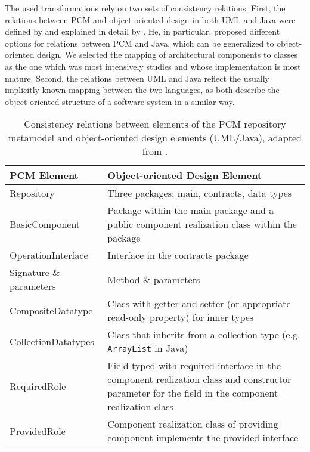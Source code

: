 The used transformations rely on two sets of consistency relations.
First, the relations between \gls{PCM} and object-oriented design in both \gls{UML} and Java were defined by and explained in detail by \textcite{langhammer2015a, langhammer2017a}.
He, in particular, proposed different options for relations between \gls{PCM} and Java, which can be generalized to object-oriented design.
We selected the mapping of architectural components to classes as the one which was most intensively studies and whose implementation is most mature.
Second, the relations between \gls{UML} and Java reflect the usually implicitly known mapping between the two languages, as both describe the object-oriented structure of a software system in a similar way.

\begin{table}
	\centering 
    \small
    \renewcommand{\arraystretch}{1.4}
	\begin{tabular}{p{3.2cm} p{6.6cm}}
		\toprule
        \textbf{\gls{PCM} Element}  & \textbf{Object-oriented Design Element} \\
        \midrule
		Repository              & Three packages: main, contracts, data types\\
		BasicComponent 		    & Package within the main package and a public component realization class within the package \\
		OperationInterface		& Interface in the contracts package \\
		Signature \& parameters & Method \& parameters \\
		CompositeDatatype       & Class with getter and setter (or appropriate read-only property) for inner types\\
		CollectionDatatypes     & Class that inherits from a collection type (e.g. \texttt{ArrayList} in Java) \\
		RequiredRole		    & Field typed with required interface in the component realization class and constructor parameter for the field in the component realization class\\
		ProvidedRole		    & Component realization class of providing component implements the provided interface\\
		\bottomrule
	\end{tabular}
	\caption[Consistency relations between PCM and UML/Java]{Consistency relations between elements of the \gls{PCM} repository metamodel and object-oriented design elements (\gls{UML}/Java), adapted from \cite[Table 4.1]{langhammer2017a}.}
	\label{tab:correctness_evaluation:errors:pcm_oo_rules}
\end{table}

